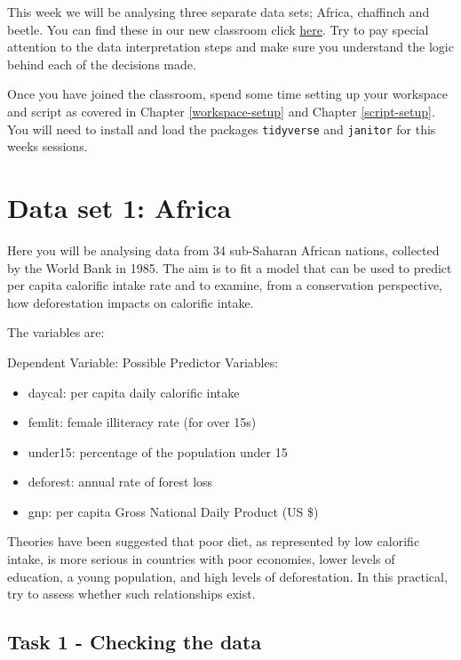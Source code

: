 \documentclass[
]{book}
\providecommand{\tightlist}{%
  \setlength{\itemsep}{0pt}\setlength{\parskip}{0pt}}
\begin{document}
This week we will be analysing three separate data sets; Africa, chaffinch and beetle. You can find these in our new classroom click \href{https://posit.cloud/spaces/445363/join?access_code=FJxK_vnNriot52seLUoKS-fpSCL4Z59m5vRW6d1d}{here}. Try to pay special attention to the data interpretation steps and make sure you understand the logic behind each of the decisions made.

Once you have joined the classroom, spend some time setting up your workspace and script as covered in Chapter \ref{workspace-setup} and Chapter \ref{script-setup}. You will need to install and load the packages \texttt{tidyverse} and \texttt{janitor} for this weeks sessions.

\hypertarget{data-set-1-africa}{%
\section{Data set 1: Africa}\label{data-set-1-africa}}

Here you will be analysing data from 34 sub-Saharan African nations, collected by the World Bank in 1985. The aim is to fit a model that can be used to predict per capita calorific intake rate and to examine, from a conservation perspective, how deforestation impacts on calorific intake.

The variables are:

Dependent Variable: Possible Predictor Variables:

\begin{itemize}
\tightlist
\item
  daycal: per capita daily calorific intake
\item
  femlit: female illiteracy rate (for over 15s)
\item
  under15: percentage of the population under 15
\item
  deforest: annual rate of forest loss
\item
  gnp: per capita Gross National Daily Product (US \$)
\end{itemize}

Theories have been suggested that poor diet, as represented by low calorific intake, is more serious in countries with poor economies, lower levels of education, a young population, and high levels of deforestation. In this practical, try to assess whether such relationships exist.

\hypertarget{task-1---checking-the-data}{%
\subsection{Task 1 - Checking the data}\label{task-1---checking-the-data}}
\end{document}
